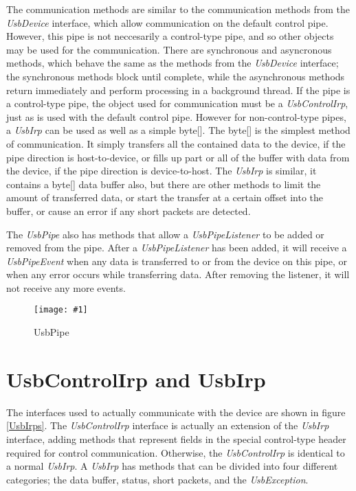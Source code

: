 \documentclass{article}
\newcommand{\myclass}[1]{\emph{#1}}
\newcommand{\myinterface}[1]{\emph{#1}}
\newcommand{\mysectionend}[0]{\vfill\pagebreak[1]}
\newcommand{\myfigure}[3]{\begin{figure}[htbp]\centering\texttt{[image: \#1]}\caption{#2}\label{#3}\end{figure}}
\begin{document}
The communication methods are similar to the communication methods
from the \myinterface{UsbDevice} interface, which allow communication on the default
control pipe.  However, this pipe is not neccesarily a control-type pipe,
and so other objects may be used for the communication.  There are
synchronous and asyncronous methods, which behave the same as the
methods from the \myinterface{UsbDevice} interface; the synchronous methods block
until complete, while the asynchronous methods return immediately
and perform processing in a background thread.  If the pipe is a
control-type pipe, the object used for communication must be
a \myinterface{UsbControlIrp}, just as is used with the default control pipe.
However for non-control-type pipes, a \myinterface{UsbIrp} can be used as
well as a simple byte[].  The byte[] is the simplest method
of communication.  It simply transfers all the contained data
to the device, if the pipe direction is host-to-device, or fills up
part or all of the buffer with data from the device, if the pipe
direction is device-to-host.  The \myinterface{UsbIrp} is similar, it contains
a byte[] data buffer also, but there are other methods to limit
the amount of transferred data, or start the transfer at a certain offset
into the buffer, or cause an error if any short packets are detected.

The \myinterface{UsbPipe} also has methods that allow a \myinterface{UsbPipeListener} to be added or removed
from the pipe.  After a \myinterface{UsbPipeListener} has been added, it will receive a
\myclass{UsbPipeEvent} when any data is transferred to or from the device on this pipe,
or when any error occurs while transferring data.  After removing the listener,
it will not receive any more events.

\myfigure{figs/UsbPipe}{UsbPipe}{UsbPipe}

\mysectionend

%

\section{UsbControlIrp and UsbIrp}

The interfaces used to actually communicate with the device are shown in
figure \ref{UsbIrps}.  The \myinterface{UsbControlIrp} interface is actually an extension
of the \myinterface{UsbIrp} interface, adding methods that represent fields in the special
control-type header required for control communication.  Otherwise, the
\myinterface{UsbControlIrp} is identical to a normal \myinterface{UsbIrp}.  A \myinterface{UsbIrp} has methods that
can be divided into four different categories; the data buffer, status,
short packets, and the \myclass{UsbException}.
\end{document}
